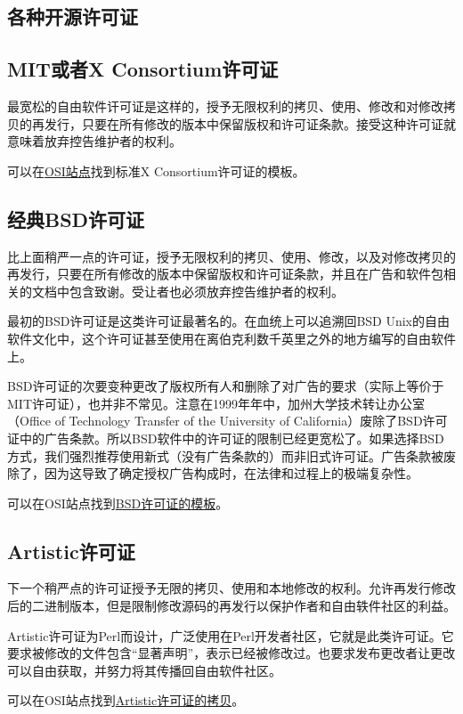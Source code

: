 \documentclass[12pt,oneside]{ctexbook}
\begin{document}
\begin{common-format}
\section{各种开源许可证}
\subsection{MIT或者X Consortium许可证}
最宽松的自由软件讦可证是这样的，授予无限权利的拷贝、使用、修改和对修改拷贝的再发行，只要在所有修改的版本中保留版权和许可证条款。接受这种许可证就意味着放弃控告维护者的权利。

可以在\href{http://www.opensource.org/licenses/mit-license.html}{OSI站点}找到标准X Consortium许可证的模板。

\subsection{经典BSD许可证}
比上面稍严一点的许可证，授予无限权利的拷贝、使用、修改，以及对修改拷贝的再发行，只要在所有修改的版本中保留版权和许可证条款，并且在广告和软件包相关的文档中包含致谢。受让者也必须放弃控告维护者的权利。

最初的BSD许可证是这类许可证最著名的。在血统上可以追溯回BSD Unix的自由软件文化中，这个许可证甚至使用在离伯克利数千英里之外的地方编写的自由软件上。

BSD许可证的次要变种更改了版权所有人和删除了对广告的要求（实际上等价于MIT许可证），也并非不常见。注意在1999年年中，加州大学技术转让办公室（Office of Technology Transfer of the University of California）废除了BSD许可证中的广告条款。所以BSD软件中的许可证的限制已经更宽松了。如果选择BSD方式，我们强烈推荐使用新式（没有广告条款的）而非旧式许可证。广告条款被废除了，因为这导致了确定授权广告构成时，在法律和过程上的极端复杂性。

可以在OSI站点找到\href{http://www.opensource.org/licenses/bsd-license.html}{BSD许可证的模板}。

\subsection{Artistic许可证}
下一个稍严点的许可证授予无限的拷贝、使用和本地修改的权利。允许再发行修改后的二进制版本，但是限制修改源码的再发行以保护作者和自由轶件社区的利益。

Artistic许可证为Perl而设计，广泛使用在Perl开发者社区，它就是此类许可证。它要求被修改的文件包含“显著声明”，表示已经被修改过。也要求发布更改者让更改可以自由获取，并努力将其传播回自由软件社区。

可以在OSI站点找到\href{http://www.opensource.org/licenses/artistic-license.html}{Artistic许可证的拷贝}。


\end{common-format}
\end{document}
